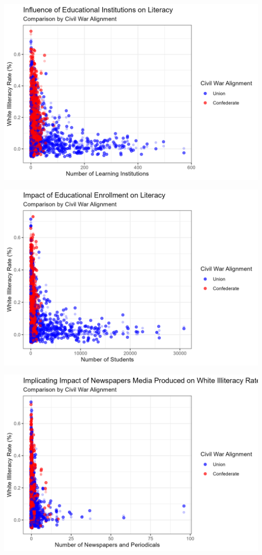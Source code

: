 \documentclass[a4paper,12pt]{article}
\begin{document}
\includegraphics[scale=1]{ACH.png}
\newline


\includegraphics[scale=1]{ACI.png}
\newline


\includegraphics[scale=1]{ACM.png}
\newline
\end{document}
